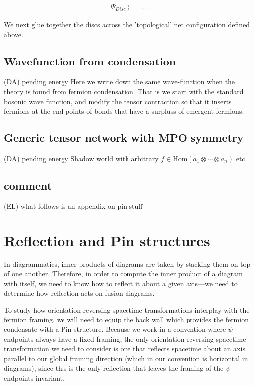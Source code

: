 \documentclass[12pt,a4paper]{article}
\newcommand{\tp}{\otimes}
\newcommand{\ket}[1]{\ensuremath{\left|#1\right\rangle}}
\newcommand{\dave}[1]{{\color{ao(english)}\footnotesize{(DA) #1}}}
\newcommand{\ethan}[1]{{\color{amethyst}\footnotesize{(EL) #1}}}
\begin{document}
\begin{align}
\ket{\Psi_{Disc}} = ....
\end{align}


We next glue together the discs across the 'topological' net configuration defined above.


\subsection{Wavefunction from condensation} 
\dave{pending energy}
Here we write down the same wave-function when the theory is found from fermion condensation. 
That is we start with the standard bosonic wave function, 
and modify the tensor contraction so that it inserts fermions at the end points of bonds that have a surpluss of emergent fermions.

\subsection{Generic tensor network with MPO symmetry }
\dave{pending energy}
Shadow world with arbitrary $ f \in \text{Hom}(a_1 \tp \cdots \tp a_n)$ etc.

 
 


 
\subsection{comment}
\ethan{what follows is an appendix on pin stuff} 
\section{Reflection and Pin structures} \label{pins_and_reflection}

In diagrammatics, inner products of diagrams are taken by stacking them on top of one another. 
Therefore, in order to compute the inner product of a diagram with itself, we need to know how to reflect it about a given axis---we need to determine how reflection acts on fusion diagrams. 

To study how orientation-reversing spacetime transformations interplay with the fermion framing, we will need to equip the back wall which provides the fermion condensate with a Pin structure. Because we work in a convention where $\psi$ endpoints always have a fixed framing, the only orientation-reversing spacetime transformation we need to consider is one that  reflects spacetime about an axis parallel to our global framing direction (which in our convention is horizontal in diagrams), since this is the only reflection that leaves the framing of the $\psi$ endpoints invariant. 
\end{document}
